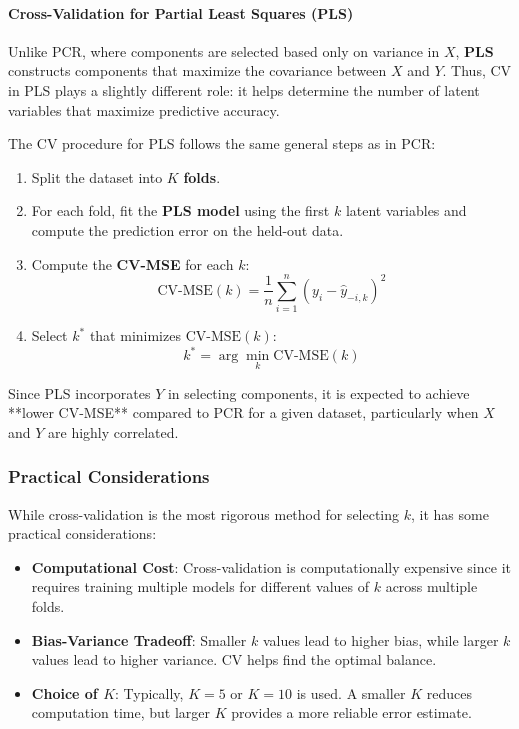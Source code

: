 \documentclass[11pt,twoside,a4paper]{article}
\begin{document}
\paragraph{Cross-Validation for Partial Least Squares (PLS)}
Unlike PCR, where components are selected based only on variance in \( X \), \textbf{PLS} constructs components that maximize the covariance between \( X \) and \( Y \). Thus, CV in PLS plays a slightly different role: it helps determine the number of latent variables that maximize predictive accuracy.

The CV procedure for PLS follows the same general steps as in PCR:
\begin{enumerate}
    \item Split the dataset into \( K \) \textbf{folds}.
    \item For each fold, fit the \textbf{PLS model} using the first \( k \) latent variables and compute the prediction error on the held-out data.
    \item Compute the \textbf{CV-MSE} for each \( k \):
    \[
    \text{CV-MSE}(k) = \frac{1}{n} \sum_{i=1}^{n} (y_i - \hat{y}_{-i,k})^2
    \]
    \item Select \( k^* \) that minimizes \(\text{CV-MSE}(k)\):
    \[
    k^* = \arg\min_k \text{CV-MSE}(k)
    \]
\end{enumerate}

Since PLS incorporates \( Y \) in selecting components, it is expected to achieve **lower CV-MSE** compared to PCR for a given dataset, particularly when \( X \) and \( Y \) are highly correlated.

\subsubsection{Practical Considerations}
While cross-validation is the most rigorous method for selecting \( k \), it has some practical considerations:
\begin{itemize}
    \item \textbf{Computational Cost}: Cross-validation is computationally expensive since it requires training multiple models for different values of \( k \) across multiple folds.
    \item \textbf{Bias-Variance Tradeoff}: Smaller \( k \) values lead to higher bias, while larger \( k \) values lead to higher variance. CV helps find the optimal balance.
    \item \textbf{Choice of \( K \)}: Typically, \( K = 5 \) or \( K = 10 \) is used. A smaller \( K \) reduces computation time, but larger \( K \) provides a more reliable error estimate.
\end{itemize}
\end{document}
